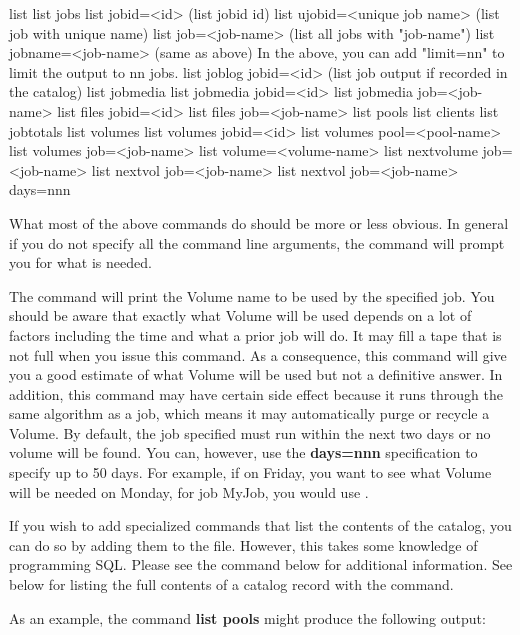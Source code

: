 \begin{description}
\begin{bconsole}{list}
list jobs
list jobid=<id>           (list jobid id)
list ujobid=<unique job name> (list job with unique name)
list job=<job-name>   (list all jobs with "job-name")
list jobname=<job-name>  (same as above)
    In the above, you can add "limit=nn" to limit the output to nn jobs.
list joblog jobid=<id> (list job output if recorded in the catalog)
list jobmedia
list jobmedia jobid=<id>
list jobmedia job=<job-name>
list files jobid=<id>
list files job=<job-name>
list pools
list clients
list jobtotals
list volumes
list volumes jobid=<id>
list volumes pool=<pool-name>
list volumes job=<job-name>
list volume=<volume-name>
list nextvolume job=<job-name>
list nextvol job=<job-name>
list nextvol job=<job-name> days=nnn
\end{bconsole}

   What most of the above commands do should be more or less obvious.  In
   general if you do not specify all the command line arguments, the
   command will prompt you for what is needed.

   The  command will print the Volume name to be used by
   the specified job.  You should be aware that exactly what Volume will be
   used depends on a lot of factors including the time and what a prior job
   will do.  It may fill a tape that is not full when you issue this
   command.  As a consequence, this command will give you a good estimate
   of what Volume will be used but not a definitive answer.  In addition,
   this command may have certain side effect because it runs through the
   same algorithm as a job, which means it may automatically purge or
   recycle a Volume. By default, the job specified must run within the
   next two days or no volume will be found. You can, however, use the
   {\bf days=nnn} specification to specify up to 50 days. For example,
   if on Friday, you want to see what Volume will be needed on Monday,
   for job MyJob, you would use .

   If you wish to add specialized commands that list the contents of the
   catalog, you can do so by adding them to the  file.
   However, this takes some knowledge of programming SQL. Please see the
    command below for additional information.  See below for
   listing the full contents of a catalog record with the 
   command.

   As an example, the command {\bf list pools} might produce  the following
   output:


\end{description}
